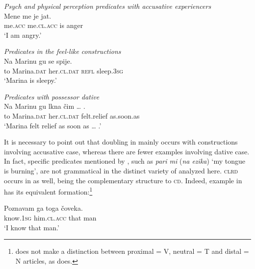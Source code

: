 \documentclass[output=paper,
colorlinks,
citecolor=brown,
newtxmath
]{langscibook}
\begin{document}

\ea \emph{Psych and physical perception predicates with accusative experiencers}\label{ex:zivojinovic:11}\\
\gll Mene   me        je  jat.\\
     me.\textsc{acc} me.\textsc{cl.acc} is  anger \\
\glt `I am angry.'


\ex \emph{Predicates in the feel-like constructions}\label{ex:zivojinovic:12}\\
\gll Na Marinu     gu         se spije.\\
     to Marina.\textsc{dat} her.\textsc{cl.dat} \textsc{refl} sleep.\textsc{3sg}\\
\glt `Marina is sleepy.'



\ex \emph{Predicates with possessor dative}\label{ex:zivojinovic:13}\\
\gll Na Marinu     gu         lkna      čim {\dots} .\\
     to Marina.\textsc{dat} her.\textsc{cl.dat} {felt.relief} {as.soon.as}\\
\glt `Marina felt relief as soon as {\dots} .'
\z


\noindent It is necessary to point out that doubling in  mainly occurs with constructions involving accusative case, whereas there are fewer examples involving dative case. In fact, specific predicates mentioned by \citet{Cinque.Krapova2008}, such as \textit{pari mi} (\textit{na ezika}) `my tongue is burning', are not grammatical in the distinct variety of  analyzed here.
\textsc{clrd} occurs in  as well, being the complementary structure to \textsc{cd}. Indeed, example  in  has its equivalent formation:\footnote{ does not make a distinction between proximal = V, neutral = T and distal = N articles, as  does.}


\ea\label{ex:zivojinovic:14}
\gll Poznavam ga          toga čoveka.\\
     know.\textsc{1sg} him.\textsc{cl.acc} that man \\
\glt `I know that man.'
\z
\end{document}
